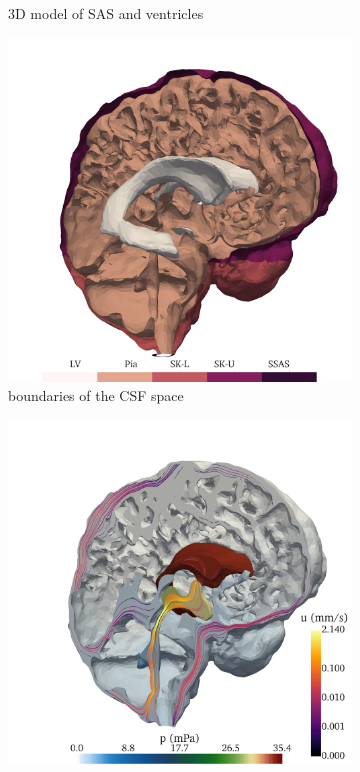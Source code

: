 \documentclass[fleqn,10pt]{wlscirep}
\begin{document}
\begin{figure}[h!]
\begin{subfigure}[b]{0.33\textwidth}
\caption{3D model of SAS and ventricles}
\label{fig:csf_flow_geom}
\end{subfigure}
\begin{subfigure}[b]{0.33\textwidth}
\includegraphics[width = 1 \textwidth]{figures/boundaries.png}
\caption{boundaries of the CSF space}
\label{fig:csf_flow_boundaries}
\end{subfigure}
\begin{subfigure}[b]{0.33\textwidth}
\includegraphics[width = 1 \textwidth]{figures/csf_v.png}

\end{subfigure}
\end{figure}
\end{document}
